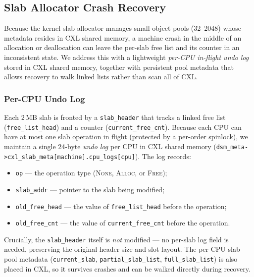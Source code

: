 
\subsection{Slab Allocator Crash Recovery}
\label{sec:slab-recovery}

Because the kernel slab allocator manages small-object pools
(\SIrange{32}{2048}{\byte}) whose metadata resides in CXL shared memory,
a machine crash in the middle of an allocation or deallocation can leave
the per-slab free list and its counter in an inconsistent state.
We address this with a lightweight \emph{per-CPU in-flight undo log}
stored in CXL shared memory, together with persistent pool metadata
that allows recovery to walk linked lists rather than scan all of CXL.

\subsubsection{Per-CPU Undo Log}

Each 2\,MB slab is fronted by a \texttt{slab\_header} that tracks a
linked free list (\texttt{free\_list\_head}) and a counter
(\texttt{current\_free\_cnt}).
Because each CPU can have at most one slab operation in flight
(protected by a per-order spinlock), we maintain a single 24-byte
\emph{undo log} per CPU in CXL shared memory
(\texttt{dsm\_meta->cxl\_slab\_meta[machine].cpu\_logs[cpu]}).
The log records:

\begin{itemize}
  \item \texttt{op} — the operation type
        (\textsc{None}, \textsc{Alloc}, or \textsc{Free});
  \item \texttt{slab\_addr} — pointer to the slab being modified;
  \item \texttt{old\_free\_head} — the value of \texttt{free\_list\_head}
        before the operation;
  \item \texttt{old\_free\_cnt} — the value of \texttt{current\_free\_cnt}
        before the operation.
\end{itemize}

\noindent
Crucially, the \texttt{slab\_header} itself is \emph{not} modified —
no per-slab log field is needed, preserving the original header size
and slot layout.  The per-CPU slab pool metadata
(\texttt{current\_slab}, \texttt{partial\_slab\_list},
\texttt{full\_slab\_list}) is also placed in CXL, so it survives
crashes and can be walked directly during recovery.

